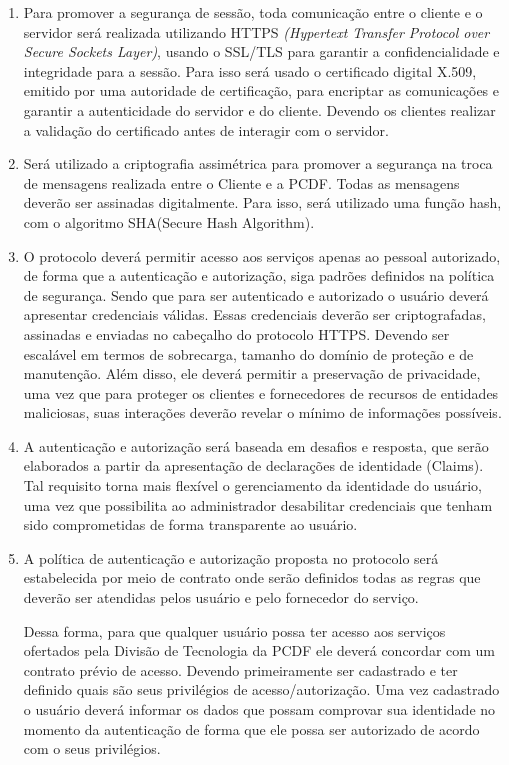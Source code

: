 \begin{enumerate}[RQ1]

\item Para promover a segurança de sessão, toda comunicação entre o cliente e o servidor será realizada utilizando HTTPS \emph{(Hypertext Transfer Protocol over Secure Sockets Layer)}, usando o SSL/TLS para garantir a confidencialidade e integridade para a sessão. Para isso será usado o certificado digital X.509, emitido por uma autoridade de certificação, para encriptar as comunicações e garantir a autenticidade do servidor e do cliente. Devendo os clientes realizar a validação do certificado antes de interagir com o servidor.

\item Será utilizado a criptografia assimétrica para promover a segurança na troca de mensagens realizada entre o Cliente e a PCDF. Todas as mensagens deverão ser assinadas digitalmente. Para isso, será utilizado uma função hash, com o algoritmo SHA(Secure Hash Algorithm).

\item O protocolo deverá permitir acesso aos serviços apenas ao pessoal autorizado, de forma que a autenticação e autorização, siga padrões definidos na política de segurança. Sendo que para ser autenticado e autorizado o usuário deverá apresentar credenciais válidas. Essas credenciais deverão ser criptografadas, assinadas e enviadas no cabeçalho do protocolo HTTPS. Devendo ser escalável em termos de sobrecarga, tamanho do domínio de proteção e de manutenção. Além disso, ele deverá permitir a preservação de privacidade, uma vez que para proteger os clientes e fornecedores de recursos de entidades maliciosas, suas interações deverão revelar o mínimo de informações possíveis.

\item A autenticação e autorização será baseada em desafios e resposta, que serão elaborados a partir da apresentação de declarações de identidade (Claims). Tal requisito torna mais flexível o gerenciamento da identidade do usuário, uma vez que possibilita ao administrador desabilitar credenciais que tenham sido comprometidas de forma transparente ao usuário.

\item A política de autenticação e autorização proposta no protocolo será estabelecida por meio de contrato onde serão definidos todas as regras que deverão ser atendidas pelos usuário e pelo fornecedor do serviço.

    Dessa forma, para que qualquer usuário possa ter acesso aos serviços ofertados pela Divisão de Tecnologia da PCDF ele deverá concordar com um contrato prévio de acesso. Devendo primeiramente ser cadastrado e ter definido quais são seus privilégios de acesso/autorização. Uma vez cadastrado o usuário deverá informar os dados que possam comprovar sua identidade no momento da autenticação de forma que ele possa ser autorizado de acordo com o seus privilégios.


\end{enumerate}
